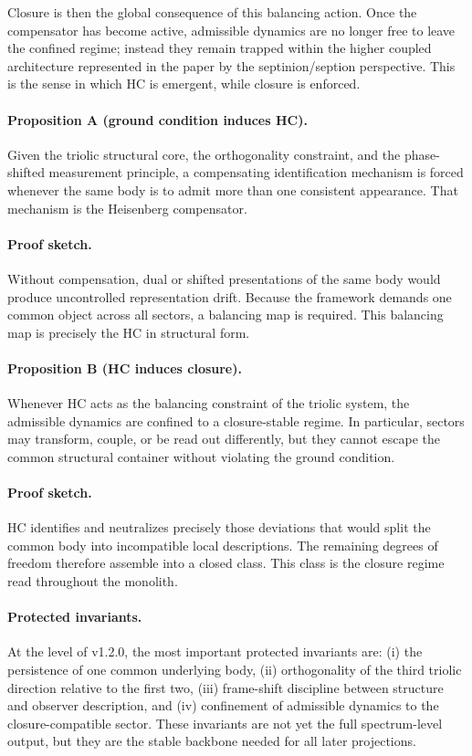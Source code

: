 Closure is then the global consequence of this balancing action. Once the
compensator has become active, admissible dynamics are no longer free to leave
the confined regime; instead they remain trapped within the higher coupled
architecture represented in the paper by the septinion/seption perspective.
This is the sense in which HC is emergent, while closure is enforced.

\paragraph{Proposition A (ground condition induces HC).}
Given the triolic structural core, the orthogonality constraint, and the
phase-shifted measurement principle, a compensating identification mechanism is
forced whenever the same body is to admit more than one consistent appearance.
That mechanism is the Heisenberg compensator.

\paragraph{Proof sketch.}
Without compensation, dual or shifted presentations of the same body would
produce uncontrolled representation drift. Because the framework demands one
common object across all sectors, a balancing map is required. This balancing
map is precisely the HC in structural form.

\paragraph{Proposition B (HC induces closure).}
Whenever HC acts as the balancing constraint of the triolic system, the
admissible dynamics are confined to a closure-stable regime. In particular,
sectors may transform, couple, or be read out differently, but they cannot
escape the common structural container without violating the ground condition.

\paragraph{Proof sketch.}
HC identifies and neutralizes precisely those deviations that would split the
common body into incompatible local descriptions. The remaining degrees of
freedom therefore assemble into a closed class. This class is the closure
regime read throughout the monolith.

\paragraph{Protected invariants.}
At the level of v1.2.0, the most important protected invariants are:
(i) the persistence of one common underlying body, (ii) orthogonality of the
third triolic direction relative to the first two, (iii) frame-shift discipline
between structure and observer description, and (iv) confinement of admissible
dynamics to the closure-compatible sector. These invariants are not yet the
full spectrum-level output, but they are the stable backbone needed for all
later projections.

